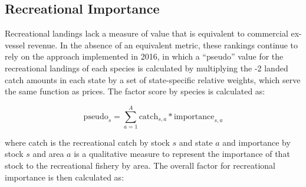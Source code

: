 \documentclass[11pt,
  english,
  a4paper,
]{article}
\begin{document}
\leavevmode\tagmcend\tagstructend\par
\endgroup{}
\endgroup{}

\newpage


\hypertarget{recreational-importance}{%
\subsection{Recreational Importance}\label{recreational-importance}}

\leavevmode\tagmcend\tagstructend


Recreational landings lack a measure of value that is equivalent to commercial ex-vessel revenue. In the absence of an equivalent metric, these rankings continue to rely on the approach implemented in 2016, in which a ``pseudo'' value for the recreational landings of each species is calculated by multiplying the -2 landed catch amounts in each state by a set of state-specific relative weights, which serve the same function as prices. The factor score by species is calculated as:

\leavevmode\tagmcend\tagstructend\par


\begin{equation}
\text{pseudo}_{s} = \sum_{a=1}^{A} \text{catch}_{s,a}*\text{importance}_{s,a}  
\end{equation}

\leavevmode\tagmcend\tagstructend\par


where catch is the recreational catch by stock {\(s\)\leavevmode\tagmcend\tagstructend} and state {\(a\)\leavevmode\tagmcend\tagstructend} and importance by stock {\(s\)\leavevmode\tagmcend\tagstructend} and area {\(a\)\leavevmode\tagmcend\tagstructend} is a qualitative measure to represent the importance of that stock to the recreational fishery by area. The overall factor for recreational importance is then calculated as:

\leavevmode\tagmcend\tagstructend\par
\end{document}

